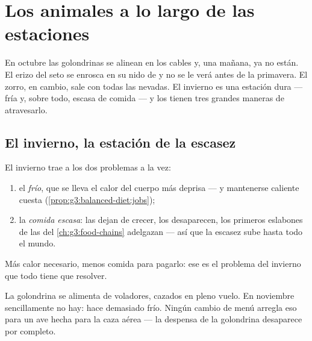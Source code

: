 \chapter{Los animales a lo largo de las estaciones}\label{ch:g3:animals-through-seasons}

En octubre las golondrinas se alinean en los cables y, una mañana, ya
no están. El erizo del seto se enrosca en su nido de  y no se le
verá antes de la primavera. El zorro, en cambio, sale con todas las
nevadas. El invierno es una estación dura --- fría y, sobre todo,
escasa de comida --- y los  tienen tres grandes maneras de
atravesarlo.

\section{El invierno, la estación de la escasez}

\begin{proposition}\label{prop:g3:animals-through-seasons:problem}
El invierno trae a los  dos problemas a la vez:
\begin{enumerate}
  \item el \emph{frío}, que se lleva el calor del cuerpo más deprisa
        --- y mantenerse caliente cuesta 
        (\cref{prop:g3:balanced-diet:jobs});
  \item la \emph{comida escasa}: las  dejan de crecer, los
         desaparecen, los primeros eslabones de las  del \cref{ch:g3:food-chains} adelgazan --- así
        que la escasez sube hasta todo el mundo.
\end{enumerate}
Más calor necesario, menos comida para pagarlo: ese es el problema del
invierno que todo  tiene que resolver.
\end{proposition}
\admitted

\begin{example}\label{ex:g3:animals-through-seasons:insects}
La golondrina se alimenta de  voladores, cazados en pleno
vuelo. En noviembre sencillamente no hay: hace demasiado frío. Ningún
cambio de menú arregla eso para un ave hecha para la caza aérea --- la
despensa de la golondrina desaparece por completo.
\end{example}

